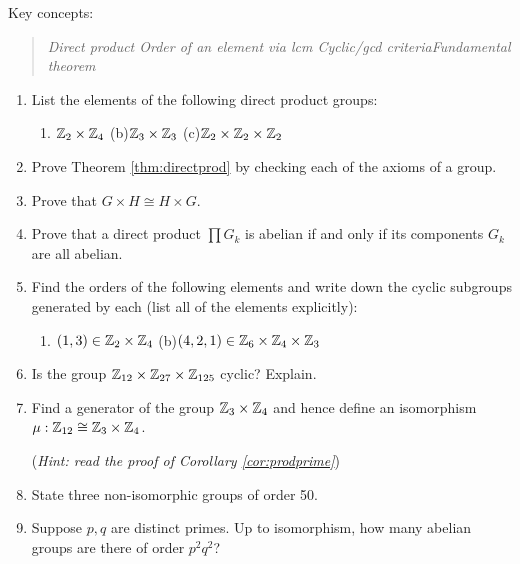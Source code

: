 \begin{exercises}
	Key concepts:
	\begin{quote}
		\emph{Direct product \quad Order of an element via lcm \quad Cyclic/gcd criteria\quad Fundamental theorem}
	\end{quote}
	
	
	\begin{enumerate}
		\item List the elements of the following direct product groups:
		\begin{enumerate}
	  	\item $\mathbb{Z}_2\times\mathbb{Z}_4$\qquad\qquad
	  	(b)\lstsp $\mathbb{Z}_3\times\mathbb{Z}_3$\qquad\qquad
	  	(c)\lstsp $\mathbb{Z}_2\times\mathbb{Z}_2\times\mathbb{Z}_2$
		\end{enumerate}
		
		
	  \item Prove Theorem \ref{thm:directprod} by checking each of the axioms of a group.
	
	
		\item Prove that $G\times H\cong H\times G$.
		
		
		\item Prove that a direct product $\prod G_k$ is abelian if and only if its components $G_k$ are all abelian.
		
		
		\item Find the orders of the following elements and write down the cyclic subgroups generated by each (list all of the elements explicitly):
		\begin{enumerate}
	  	\item $(1,3)\in\mathbb{Z}_2\times\mathbb{Z}_4$\qquad\qquad
	  	(b)\lstsp $(4,2,1)\in\mathbb{Z}_6\times\mathbb{Z}_4\times\mathbb{Z}_3$
		\end{enumerate}
		
		
		\item Is the group $\mathbb{Z}_{12}\times \mathbb{Z}_{27}\times\mathbb{Z}_{125}$ cyclic? Explain.
	
	
		\item Find a generator of the group $\mathbb{Z}_3\times\mathbb{Z}_4$ and hence define an isomorphism $\mu:\mathbb{Z}_{12}\cong\mathbb{Z}_3\times\mathbb{Z}_4$.\par
		(\emph{Hint: read the proof of Corollary \ref{cor:prodprime}})
	
	
		\item State three non-isomorphic groups of order 50.
		
		
		\item Suppose $p,q$ are distinct primes. Up to isomorphism, how many abelian groups are there of order $p^2q^2$?
		

\end{enumerate}
\end{exercises}
